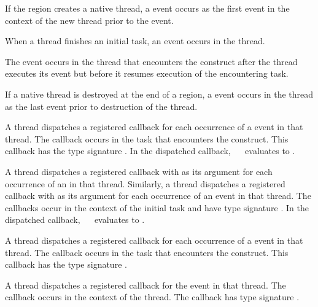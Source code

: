 If the  region creates a native thread, a 
event occurs as the first event in the context of the new thread prior to the 
 event.

When a thread finishes an initial task, an 
event occurs in the thread.

The  event occurs in the thread that encounters the
 construct after the thread executes its  
event but before it resumes execution of the encountering task.

If a native thread is destroyed at the end of a  region, a
 event occurs in the thread as the last event prior 
to destruction of the thread.

\tools

A thread dispatches a registered 
callback for each occurrence of a  event in that
thread.  The callback occurs in the task that encounters the 
 construct.  This callback has the type signature
. In the dispatched callback, 
\code{(}~\code{&}~ evaluates to .

A thread dispatches a registered 
callback with  as its  argument
for each occurrence of an  in that thread.
Similarly, a thread dispatches a registered 
callback with  as its  argument
for each occurrence of an  event in that thread.
The callbacks occur in the context of the initial task and have type 
signature . In the dispatched
callback, \code{(}~\code{&}~ evaluates to
.

A thread dispatches a registered 
callback for each occurrence of a  event in that
thread.  The callback occurs in the task that encounters
the  construct.  This callback has the type signature
.

A thread dispatches a registered 
callback for the  event in that thread.
The callback occurs in the context of the thread.  The callback 
has type signature .

